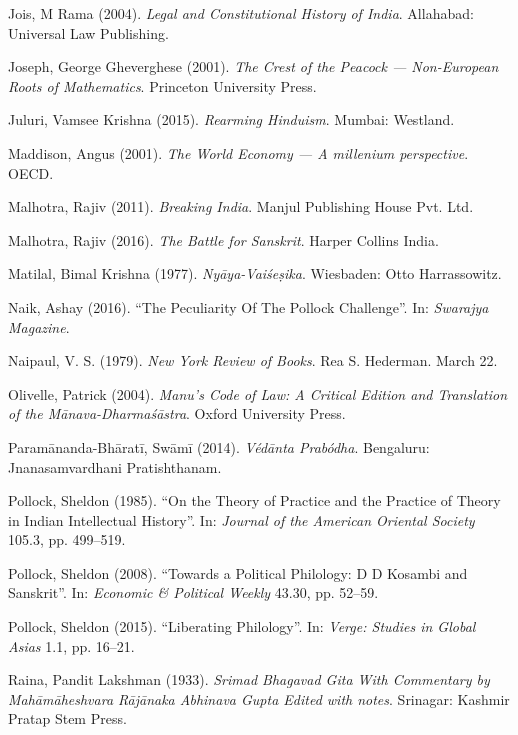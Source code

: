 \begin{thebibliography}{99}
Jois, M Rama (2004). {\sl Legal and Constitutional History of India}. Allahabad: Universal Law Publishing.

Joseph, George Gheverghese (2001). {\sl The Crest of the Peacock --- Non-European Roots of Mathematics}. Princeton University Press.

Juluri, Vamsee Krishna (2015). {\sl Rearming Hinduism}. Mumbai: Westland.

Maddison, Angus (2001). {\sl The World Economy --- A millenium perspective}. OECD.

Malhotra, Rajiv (2011). {\sl Breaking India}. Manjul Publishing House Pvt. Ltd.

Malhotra, Rajiv (2016). {\sl The Battle for Sanskrit}. Harper Collins India.

Matilal, Bimal Krishna (1977). {\sl Nyāya-Vaiśeṣika}. Wiesbaden: Otto Harrassowitz.

Naik, Ashay (2016). ``The Peculiarity Of The Pollock Challenge''. In: {\sl Swarajya Magazine}.

Naipaul, V. S. (1979). {\sl New York Review of Books}. Rea S. Hederman. March 22.

Olivelle, Patrick (2004). {\sl Manu’s Code of Law: A Critical Edition and Translation of the Mānava-Dharmaśāstra}. Oxford University Press.

Paramānanda-Bhāratī, Swāmī (2014). {\sl Védānta Prabódha}. Bengaluru: Jnanasamvardhani Pratishthanam.

Pollock, Sheldon (1985). ``On the Theory of Practice and the Practice of Theory in Indian Intellectual History''. In: {\sl Journal of the American Oriental Society} 105.3, pp. 499--519.

Pollock, Sheldon (2008). ``Towards a Political Philology: D D Kosambi and Sanskrit''. In: {\sl Economic \& Political Weekly} 43.30, pp. 52--59.

Pollock, Sheldon  (2015). ``Liberating Philology''. In: {\sl Verge: Studies in Global Asias} 1.1, pp. 16--21.

Raina, Pandit Lakshman (1933). {\sl Srimad Bhagavad Gita With Commentary by Mahāmāheshvara Rājānaka Abhinava Gupta Edited with notes}. Srinagar: Kashmir Pratap Stem Press.


\end{thebibliography}
